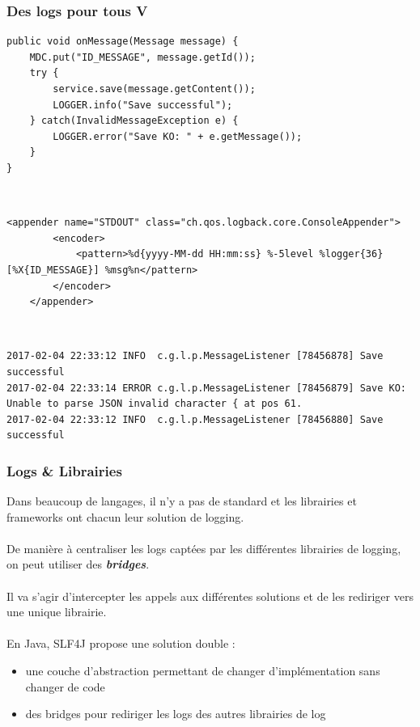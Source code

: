 \begin{frame}[fragile]
	\frametitle{Des logs pour tous V}

    \begin{lstlisting}[basicstyle=\tiny]
public void onMessage(Message message) {
    MDC.put("ID_MESSAGE", message.getId());
    try {
        service.save(message.getContent());
        LOGGER.info("Save successful");
    } catch(InvalidMessageException e) {
        LOGGER.error("Save KO: " + e.getMessage());
    }
}
    \end{lstlisting}
    ~\\
    \begin{lstlisting}[basicstyle=\tiny]
	<appender name="STDOUT" class="ch.qos.logback.core.ConsoleAppender">
		<encoder>
      		<pattern>%d{yyyy-MM-dd HH:mm:ss} %-5level %logger{36} [%X{ID_MESSAGE}] %msg%n</pattern>
    	</encoder>
	</appender>
    \end{lstlisting}
    ~\\
    \begin{lstlisting}[basicstyle=\tiny]
2017-02-04 22:33:12 INFO  c.g.l.p.MessageListener [78456878] Save successful
2017-02-04 22:33:14 ERROR c.g.l.p.MessageListener [78456879] Save KO: Unable to parse JSON invalid character { at pos 61.
2017-02-04 22:33:12 INFO  c.g.l.p.MessageListener [78456880] Save successful
    \end{lstlisting}
\end{frame}

\begin{frame}[fragile]
	\frametitle{Logs \& Librairies}

    Dans beaucoup de langages, il n'y a pas de standard et les librairies et frameworks ont chacun leur solution de logging.
    \\~\\
    De mani\`{e}re \`{a} centraliser les logs capt\'{e}es par les diff\'{e}rentes librairies de logging, on peut utiliser des \textbf{\textit{bridges}}.
    \\~\\
    Il va s'agir d'intercepter les appels aux diff\'{e}rentes solutions et de les rediriger vers une unique librairie.
    \\~\\
    En Java, SLF4J propose une solution double :
    \begin{itemize}
    	\item une couche d'abstraction permettant de changer d'impl\'{e}mentation sans changer de code
        \item des bridges pour rediriger les logs des autres librairies de log
    \end{itemize}  
\end{frame}

